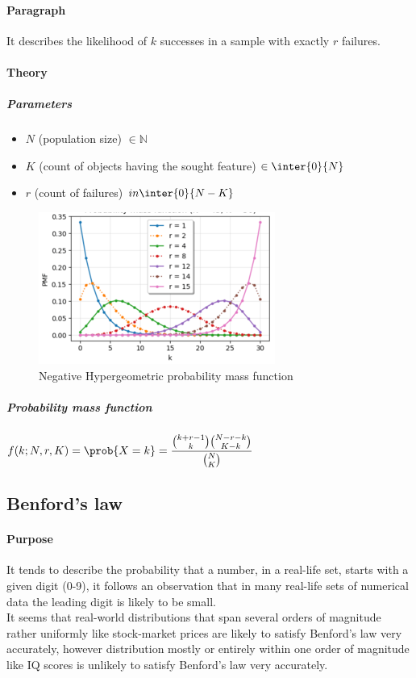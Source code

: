 \paragraph{Paragraph}
It describes the likelihood of $k$ successes in a sample with exactly $r$ failures.
\paragraph{Theory}
\subparagraph{Parameters}
\begin{itemize}
    \item $N$ (population size) $\in\mathbb{N}$
    \item $K$ (count of objects having the sought feature) $\in\inter{0}{N}$
    \item $r$ (count of failures) $in\inter{0}{N-K}$
\end{itemize}
\begin{figure}[H]
    \begin{center}
        \includegraphics[width=.5\textwidth]{./chapters/2_statistics/02_common_probability_distributions/images/03_neg_hypergeometric_pmf.png}
    \end{center}
    \caption{Negative Hypergeometric probability mass function}
    \label{fig:03_neg_hypergeometric_pmf}
\end{figure}
\subparagraph{Probability mass function}
$f(k; N, r, K) = \prob{X=k} = \dfrac{{k+r-1\choose k}{N-r-k\choose K-k}}{{N\choose K}}$

\subsection{Benford's law}
\paragraph{Purpose}
It tends to describe the probability that a number, in a real-life set,  starts with a given digit
(0-9), it follows an observation that in many real-life sets of numerical data the leading digit is
likely to be small.\\
It seems that real-world distributions that span several orders of magnitude rather uniformly like
stock-market prices are likely to satisfy Benford's law very accurately, however distribution mostly
or entirely within one order of magnitude like IQ scores is unlikely to satisfy Benford's law very
accurately.
